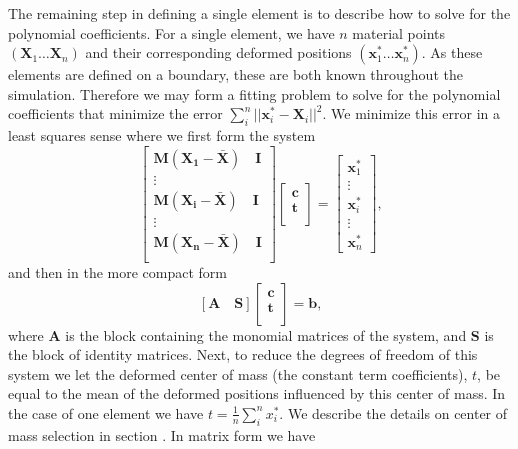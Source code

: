 The remaining step in defining a single element is to describe how to solve for the polynomial coefficients. For a single element, we have $n$ material points $(\mathbf{X}_1 \dots \mathbf{X}_n)$ and their corresponding deformed positions $(\mathbf{x}^*_1 \dots \mathbf{x}^*_n)$. As these elements are defined on a boundary, these are both known throughout the simulation. Therefore we may form a fitting problem to solve for the polynomial coefficients that minimize the error $\sum_i^n ||\mathbf{x}_i^* - \mathbf{X}_i ||^2$.  We minimize this error in a least squares sense where we first form the system
\begin{equation}
\left[\begin{array}{c}
\mathbf{M}(\mathbf{X_1-\bar{X}}) \quad \mathbf{I} \\
\vdots \\
\mathbf{M}(\mathbf{X_i-\bar{X}}) \quad \mathbf{I} \\
\vdots \\
\mathbf{M}(\mathbf{X_n-\bar{X}}) \quad \mathbf{I} \\
\end{array} \right]
\left[ \begin{array}{c}
\mathbf{c} \\
\mathbf{t} \\
\end{array} \right] = 
\left[ \begin{array}{c}
\mathbf{x}_1^* \\
\vdots \\
\mathbf{x}_i^* \\
\vdots \\
\mathbf{x}_n^*
\end{array} \right]
\text{,}
\end{equation}
and then in the more compact form
\begin{equation}
\label{eqn:fitting_one}
\left[
\mathbf{A} \quad \mathbf{S}
\right]
\left[ \begin{array}{c}
\mathbf{c} \\
\mathbf{t} \\
\end{array} \right] = \mathbf{b}
\text{,}
\end{equation}
where $\mathbf{A}$ is the block containing the monomial matrices of the system, and $\mathbf{S}$ is the block of identity matrices. Next, to reduce the degrees of freedom of this system we let the deformed center of mass (the constant term coefficients), $t$, be equal to the mean of the deformed positions influenced by this center of mass. In the case of one element we have $t = \frac{1}{n}\sum_i^n x_i^*$. We describe the details on center of mass selection in section . In matrix form we have
